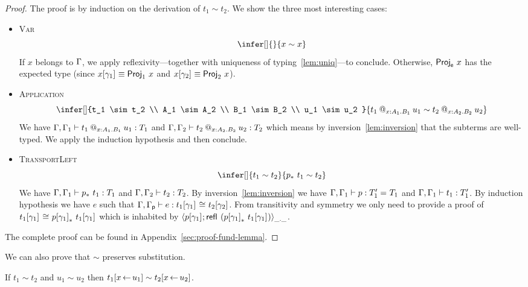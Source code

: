 \begin{proof}
  The proof is by induction on the derivation of $t_1 \sim t_2$. We show
  the three most interesting cases:

  \begin{itemize}
  \item \textsc{Var}
    \[
      \infer[]
        { }
        {x \sim x}
    \]
    If $x$ belongs to $\Ga$, we apply reflexivity---together with uniqueness of
    typing~\eqref{lem:uniq}---to conclude.
    Otherwise, $\ProjE{x}$ has the expected type (since
    $\llift{\gamma}{}{x} \equiv \ProjO{x}$ and $\rlift{\gamma}{}{x} \equiv \ProjT{x}$).

  \item \textsc{Application}
    \[
      \infer[]
        {t_1 \sim t_2 \\
         A_1 \sim A_2 \\
         B_1 \sim B_2 \\
         u_1 \sim u_2
        }
        {\app{t_1}{x:A_1}{B_1}{u_1} \sim \app{t_2}{x:A_2}{B_2}{u_2}}
    \]
    We have $\isterm{\Ga, \Ga_1}{\app{t_1}{x:A_1}{B_1}{u_1}}{T_1}$ and
    $\isterm{\Ga, \Ga_2}{\app{t_2}{x:A_2}{B_2}{u_2}}{T_2}$ which means by
    inversion~\eqref{lem:inversion} that the subterms are well-typed.
    We apply the induction hypothesis and then conclude.
  \item \textsc{TransportLeft}
    \[
      \infer[]
        {t_1 \sim t_2}
        {\transpo{p}\ t_1 \sim t_2}
    \]
    We have $\isterm{\Ga, \Ga_1}{\transpo{p}\ t_1}{T_1}$ and
    $\isterm{\Ga, \Ga_2}{t_2}{T_2}$.
    By inversion~\eqref{lem:inversion} we have
    $\isterm{\Ga, \Ga_1}{p}{\Eq{}{T_1'}{T_1}}$ and
    $\isterm{\Ga, \Ga_1}{t_1}{T_1'}$.
    By induction hypothesis we have $e$ such that
    $\isterm{\Ga, \Gp}{e}{\Heq{}{\llift{\gamma}{}{t_1}}{}{\rlift{\gamma}{}{t_2}}}$.
    From transitivity and symmetry we only need to provide a proof of
    $\Heq{}{\llift{\gamma}{}{t_1}}{}{\transpo{\llift{\gamma}{}{p}}\ \llift{\gamma}{}{t_1}}$ which is inhabited by
    $\pair{\_}{\_}{\llift{\gamma}{}{p}}{\refl{} (\transpo{\llift{\gamma}{}{p}}\ \llift{\gamma}{}{t_1})}$.
  \end{itemize}

  The complete proof can be found in Appendix~\ref{sec:proof-fund-lemma}.
\end{proof}

We can also prove that $\sim$ preserves substitution.

\begin{lemma}
  If $t_1 \sim t_2$ and $u_1 \sim u_2$ then
  $t_1[x \sto u_1] \sim t_2[x \sto u_2]$.
\end{lemma}


